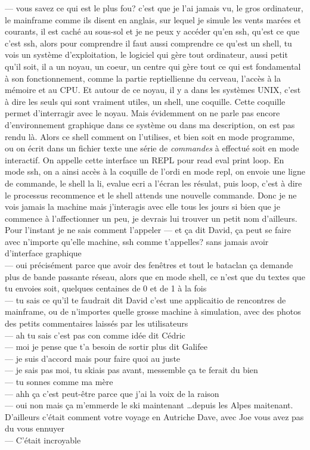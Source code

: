 \documentclass{article}
\begin{document}
--- vous savez ce qui est le plus fou? c'est que je l'ai jamais vu, le gros
ordinateur, le mainframe comme ils disent en anglais, sur lequel je simule les
vents marées et courants, il est caché au sous-sol et je ne peux y accéder qu'en
ssh, qu'est ce que c'est ssh, alors pour comprendre il faut aussi comprendre ce
qu'est un shell, tu vois un système d'exploitation, le logiciel qui gère tout
ordinateur, aussi petit qu'il soit, il a un noyau, un coeur, un centre qui gère
tout ce qui est fondamental à son fonctionnement, comme la partie reptiellienne
du cerveau, l'accès à la mémoire et au CPU. Et autour de ce noyau, il y a dans
les systèmes UNIX, c'est à dire les seuls qui sont vraiment utiles, un shell,
une coquille. Cette coquille permet d'interragir avec le noyau. Mais évidemment
on ne parle pas encore d'environnement graphique dans ce système ou dans ma
description, on est pas rendu là. Alors ce shell comment on l'utilises, et bien
soit en mode programme, ou on écrit dans un fichier texte une série de
\emph{commandes} à effectué soit en mode interactif. On appelle cette interface
un REPL pour read eval print loop. En mode ssh, on a ainsi accès à la coquille
de l'ordi en mode repl, on envoie une ligne de commande, le shell la li, evalue
ecri a l'écran les résulat, puis loop, c'est à dire le processus recommence et
le shell attends une nouvelle commande. Donc je ne vois jamais la machine mais
j'interagis avec elle tous les jours si bien que je commence à l'affectionner un
peu, je devrais lui trouver un petit nom d'ailleurs. Pour l'instant je ne sais
comment l'appeler
--- et ça dit David, ça peut se faire avec n'importe qu'elle machine, ssh comme
t'appelles? sans jamais avoir d'interface graphique\\
--- oui précisément parce que avoir des fenêtres et tout le bataclan ça demande
plus de bande passante réseau, alors que en mode shell, ce n'est que du textes
que tu envoies soit, quelques centaines de 0 et de 1 à la fois\\
--- tu sais ce qu'il te faudrait dit David c'est une applicaitio de rencontres
de mainframe, ou de n'importes quelle grosse machine à simulation, avec des photos
des petits commentaires laissés par les utilisateurs\\
--- ah tu sais c'est pas con comme idée dit Cédric\\
--- moi je pense que t'a besoin de sortir plus dit Galifee\\
--- je suis d'accord mais pour faire quoi au juste\\
--- je sais pas moi, tu skiais pas avant, messemble ça te ferait du bien\\
--- tu sonnes comme ma mère\\
--- ahh ça c'est peut-être parce que j'ai la voix de la raison\\
--- oui non mais ça m'emmerde le ski maintenant \ldots depuis les Alpes maitenant.
D'ailleurs c'était comment votre voyage en Autriche Dave, avec Joe vous avez pas du vous
ennuyer\\
--- C'était incroyable\\
\end{document}
